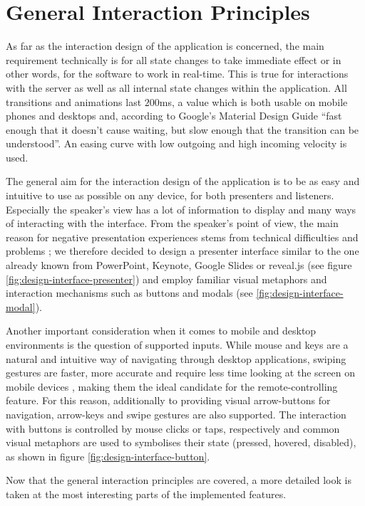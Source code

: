 \section{General Interaction Principles}
As far as the interaction design of the application is concerned, the main requirement technically is for all state changes to take immediate effect or in other words, for the software to work in real-time. This is true for interactions with the server as well as all internal state changes within the application. All transitions and animations last $200$ms, a value which is both usable on mobile phones and desktops and, according to Google's Material Design Guide \cite{GoogleMaterialDesignGuide} ``fast enough that it doesn't cause waiting, but slow enough that the transition can be understood''. An easing curve with low outgoing and high incoming velocity is used.

The general aim for the interaction design of the application is to be as easy and intuitive to use as possible on any device, for both presenters and listeners. Especially the speaker's view has a lot of information to display and many ways of interacting with the interface. From the speaker's point of view, the main reason for negative presentation experiences stems from technical difficulties and problems \cite{Wacker:PresenterExperience}; we therefore decided to design a presenter interface similar to the one already known from PowerPoint, Keynote, Google Slides or reveal.js (see figure \ref{fig:design-interface-presenter}) and employ familiar visual metaphors and interaction mechanisms such as buttons and modals (see \ref{fig:design-interface-modal}).

Another important consideration when it comes to mobile and desktop environments is the question of supported inputs. While mouse and keys are a natural and intuitive way of navigating through desktop applications, swiping gestures are faster, more accurate \cite{Lai:SingleHandedThumbInteraction} and require less time looking at the screen on mobile devices \cite{Negulescu:TapSwipeMove}, making them the ideal candidate for the remote-controlling feature. For this reason, additionally to providing visual arrow-buttons for navigation, arrow-keys and swipe gestures are also supported. The interaction with buttons is controlled by mouse clicks or taps, respectively and common visual metaphors are used to symbolises their state (pressed, hovered, disabled), as shown in figure \ref{fig:design-interface-button}.

Now that the general interaction principles are covered, a more detailed look is taken at the most interesting parts of the implemented features.

